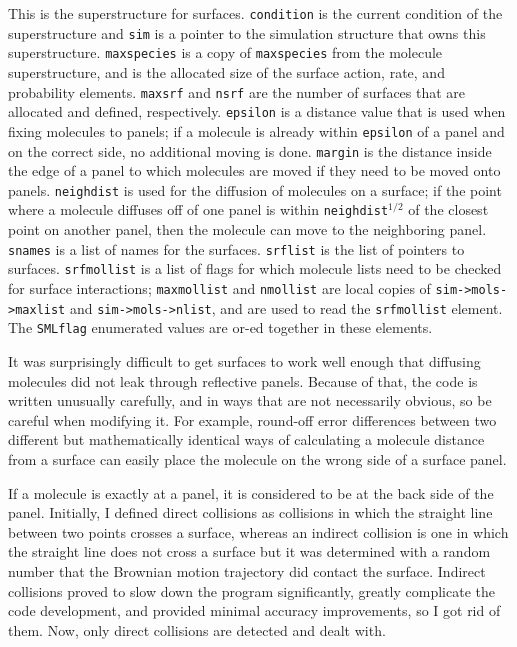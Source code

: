 \documentclass {scrbook}
\newcommand {\ttt} {\texttt}
\begin{document}
This is the superstructure for surfaces. \ttt{condition} is the current condition of the superstructure and \ttt{sim} is a pointer to the simulation structure that owns this superstructure. \ttt{maxspecies} is a copy of \ttt{maxspecies} from the molecule superstructure, and is the allocated size of the surface action, rate, and probability elements. \ttt{maxsrf} and \ttt{nsrf} are the number of surfaces that are allocated and defined, respectively. \ttt{epsilon} is a distance value that is used when fixing molecules to panels; if a molecule is already within \ttt{epsilon} of a panel and on the correct side, no additional moving is done. \ttt{margin} is the distance inside the edge of a panel to which molecules are moved if they need to be moved onto panels. \ttt{neighdist} is used for the diffusion of molecules on a surface; if the point where a molecule diffuses off of one panel is within \ttt{neighdist}$^{1/2}$ of the closest point on another panel, then the molecule can move to the neighboring panel. \ttt{snames} is a list of names for the surfaces. \ttt{srflist} is the list of pointers to surfaces. \ttt{srfmollist} is a list of flags for which molecule lists need to be checked for surface interactions; \ttt{maxmollist} and \ttt{nmollist} are local copies of \ttt{sim->mols->maxlist} and \ttt{sim->mols->nlist}, and are used to read the \ttt{srfmollist} element. The \ttt{SMLflag} enumerated values are or-ed together in these elements.

It was surprisingly difficult to get surfaces to work well enough that diffusing molecules did not leak through reflective panels. Because of that, the code is written unusually carefully, and in ways that are not necessarily obvious, so be careful when modifying it. For example, round-off error differences between two different but mathematically identical ways of calculating a molecule distance from a surface can easily place the molecule on the wrong side of a surface panel.

If a molecule is exactly at a panel, it is considered to be at the back side of the panel. Initially, I defined direct collisions as collisions in which the straight line between two points crosses a surface, whereas an indirect collision is one in which the straight line does not cross a surface but it was determined with a random number that the Brownian motion trajectory did contact the surface. Indirect collisions proved to slow down the program significantly, greatly complicate the code development, and provided minimal accuracy improvements, so I got rid of them. Now, only direct collisions are detected and dealt with.\newline
\end{document}
